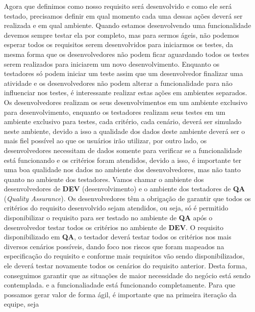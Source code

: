       Agora que definimos como nosso requisito será desenvolvido e como ele será
      testado, precisamos definir em qual momento cada uma dessas ações deverá ser
      realizada e em qual ambiente. Quando estamos desenvolvendo uma funcionalidade
      devemos sempre testar ela por completo, mas para sermos ágeis, não podemos
      esperar todos os requisitos serem desenvolvidos para iniciarmos os testes,
      da mesma forma que os desenvolvedores não podem ficar aguardando todos os
      testes serem realizados para iniciarem um novo desenvolvimento. Enquanto os
      testadores só podem iniciar um teste assim que um desenvolvedor finalizar
      uma atividade e os desenvolvedores não podem alterar a funcionalidade para não
      influenciar nos testes, é interessante realizar estas ações em ambientes
      separados. Os desenvolvedores realizam os seus desenvolvimentos em um ambiente
      exclusivo para desenvolvimento, enquanto os testadores realizam seus testes
      em um ambiente exclusivo para testes, cada critério, cada cenário, deverá ser
      simulado neste ambiente, devido a isso a qualidade dos dados deste ambiente
      deverá ser o mais fiel possível ao que os usuários irão utilizar, por outro
      lado, os desenvolvedores necessitam de dados somente para verificar se a
      funcionalidade está funcionando e os critérios foram atendidos, devido a isso,
      é importante ter uma boa qualidade nos dados no ambiente dos desenvolvedores,
      mas não tanto quanto no ambiente dos testadores. Vamos chamar o ambiente dos
      desenvolvedores de \textbf{DEV} (desenvolvimento) e o ambiente dos testadores
      de \textbf{QA} (\textit{Quality Assurance}). \newline
      Os desenvolvedores têm a obrigação de garantir que todos os critérios do
      requisito desenvolvido sejam atendidos, ou seja, só é permitido disponibilizar
      o requisito para ser testado no ambiente de \textbf{QA} após o desenvolvedor
      testar todos os critérios no ambiente de \textbf{DEV}. O requisito disponibilizado
      em \textbf{QA}, o testador deverá testar todos os critérios nos mais diversos
      cenários possíveis, dando foco nos riscos que foram mapeados na especificação
      do requisito e conforme mais requisitos vão sendo disponibilizados, ele deverá
      testar novamente todos os cenários do requisito anterior. Desta forma, conseguimos
      garantir que as situações de maior necessidade do negócio está sendo contemplada.
      e a funcionaliadade está funcionando completamente. Para que possamos gerar
      valor de forma ágil, é importante que na primeira iteração da equipe, seja
